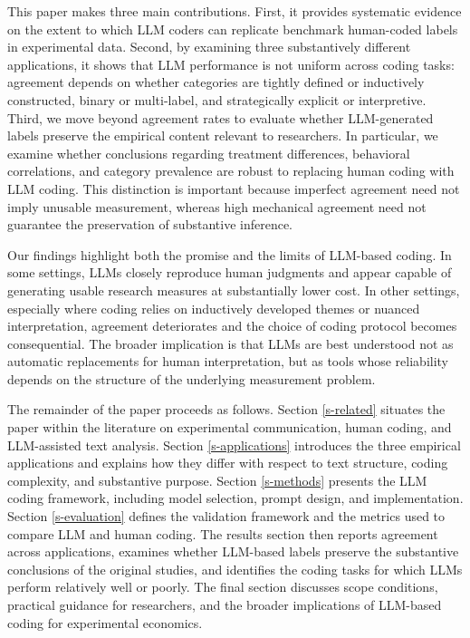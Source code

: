 \documentclass[11pt]{article}
\begin{document}
\begin{sloppypar}
This paper makes three main contributions. First, it provides systematic evidence on the extent to which LLM coders can replicate benchmark human-coded labels in experimental data. Second, by examining three substantively different applications, it shows that LLM performance is not uniform across coding tasks: agreement depends on whether categories are tightly defined or inductively constructed, binary or multi-label, and strategically explicit or interpretive. Third, we move beyond agreement rates to evaluate whether LLM-generated labels preserve the empirical content relevant to researchers. In particular, we examine whether conclusions regarding treatment differences, behavioral correlations, and category prevalence are robust to replacing human coding with LLM coding. This distinction is important because imperfect agreement need not imply unusable measurement, whereas high mechanical agreement need not guarantee the preservation of substantive inference. 

Our findings highlight both the promise and the limits of LLM-based coding. In some settings, LLMs closely reproduce human judgments and appear capable of generating usable research measures at substantially lower cost. In other settings, especially where coding relies on inductively developed themes or nuanced interpretation, agreement deteriorates and the choice of coding protocol becomes consequential. The broader implication is that LLMs are best understood not as automatic replacements for human interpretation, but as tools whose reliability depends on the structure of the underlying measurement problem.

The remainder of the paper proceeds as follows. Section \ref{s-related} situates the paper within the literature on experimental communication, human coding, and LLM-assisted text analysis. Section \ref{s-applications} introduces the three empirical applications and explains how they differ with respect to text structure, coding complexity, and substantive purpose. Section \ref{s-methods} presents the LLM coding framework, including model selection, prompt design, and implementation. Section \ref{s-evaluation} defines the validation framework and the metrics used to compare LLM and human coding. The results section then reports agreement across applications, examines whether LLM-based labels preserve the substantive conclusions of the original studies, and identifies the coding tasks for which LLMs perform relatively well or poorly. The final section discusses scope conditions, practical guidance for researchers, and the broader implications of LLM-based coding for experimental economics.



\end{sloppypar}
\end{document}
